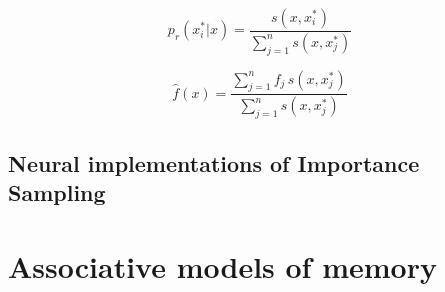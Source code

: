 \documentclass[10pt,letterpaper]{article}
\begin{document}


\begin{equation}
	p_{r}(x^{*}_{i}|x)=\frac{s(x,x^{*}_{i})}{\sum^{n}_{j=1}s(x,x^{*}_{j})}
\end{equation}

\cite{ashby1995categorization}


\begin{equation}
	\hat{f}(x)=\frac{\sum^{n}_{j=1}f_{j}\,s(x,x^{*}_{j})}{\sum^{n}_{j=1}s(x,x^{*}_{j})}
\end{equation}



\cite{neal1993probabilistic,Shi2010}

\subsection{Neural implementations of Importance Sampling}
\cite{Shi2009}









\section{Associative models of memory}
\end{document}
